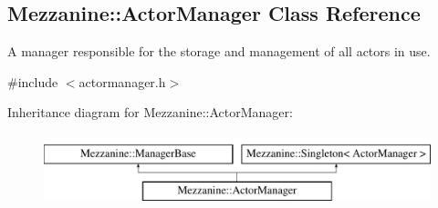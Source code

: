 \hypertarget{classMezzanine_1_1ActorManager}{
\subsection{Mezzanine::ActorManager Class Reference}
\label{classMezzanine_1_1ActorManager}
}


A manager responsible for the storage and management of all actors in use.  




{\ttfamily \#include $<$actormanager.h$>$}

Inheritance diagram for Mezzanine::ActorManager:\begin{figure}[H]
\begin{center}
\leavevmode
\includegraphics[height=2.000000cm]{classMezzanine_1_1ActorManager}
\end{center}
\end{figure}
